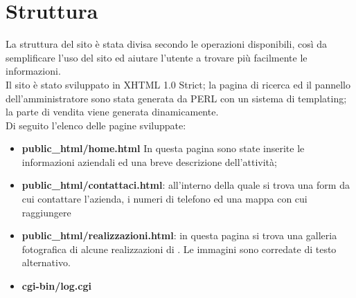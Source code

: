 \section{Struttura}{
	La struttura del sito è stata divisa secondo le operazioni disponibili, così da semplificare l'uso del sito ed aiutare l'utente a trovare più facilmente le informazioni.
	\\
	Il sito è stato sviluppato in XHTML 1.0 Strict; la pagina di ricerca ed il pannello dell'amministratore sono stata generata da PERL con un sistema di templating; la parte di vendita viene generata dinamicamente.
	\\
	Di seguito l'elenco delle pagine sviluppate:
	\begin{itemize}
		\item \textbf{ public_html/home.html} In questa pagina sono state inserite le informazioni aziendali ed una breve descrizione dell'attività; 
		\item \textbf{public_html/contattaci.html}: all'interno della quale si trova una form da cui contattare l'azienda, i numeri di telefono ed una mappa con cui raggiungere \textbf{\ggt} 
		\item \textbf{public_html/realizzazioni.html}: in questa pagina si trova una galleria fotografica di alcune realizzazioni di \textbf{\ggt}. Le immagini sono corredate di testo alternativo.
		\item \textbf{cgi-bin/log.cgi} 
	\end{itemize}
}
